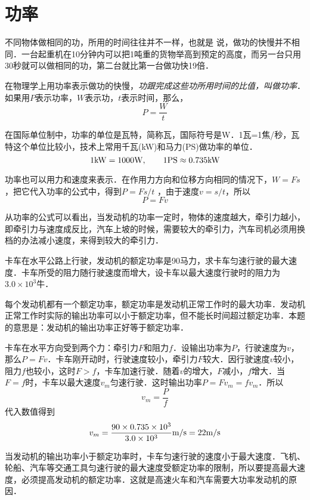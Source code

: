 \section{功率}

不同物体做相同的功，所用的时间往往并不一样，也就是
说，做功的快慢并不相同．一台起重机在10分钟内可以把1吨重的货物举高到预定的高度，而另一台只用30秒就可以做相同的功，第二台就比第一台做功快19倍．

在物理学上用功率表示做功的快慢，\textit{功跟完成这些功所用时间的比值，叫做功率}．如果用$P$表示功率，$W$表示功，$t$表示时间，那么，
\[P=\frac{W}{t}\]

在国际单位制中，功率的单位是瓦特，简称瓦，国际符号是W．1瓦=1焦/秒，瓦特这个单位比较小，技术上常用千瓦(kW)和马力(PS)做功率的单位．
\[1{\rm kW}=1000{\rm W},\qquad 1{\rm PS}\approx 0.735{\rm kW}\]

功率也可以用力和速度来表示．在作用力方向和位移方向相同的情况下，$W=Fs$，把它代入功率的公式中，得到$P=Fs/t$
，由于速度$v=s/t$，所以
\[P=Fv \]

从功率的公式可以看出，当发动机的功率一定时，物体的速度越大，牵引力越小，即牵引力与速度成反比，汽车上坡的时候，需要较大的牵引力，汽车司机必须用换档的办法减小速度，来得到较大的牵引力．


	
\begin{example}
卡车在水平公路上行驶，发动机的额定功率是90马力，求卡车匀速行驶的最大速度．卡车所受的阻力随行驶速度而增大，设卡车以最大速度行驶时的阻力为$3.0\times 10^3$牛．
\end{example}

\begin{solution}
    每个发动机都有一个额定功率，额定功率是发动机正常工作时的最大功率．发动机正常工作时实际的输出功率可以小于额定功率，但不能长时间超过额定功率．本题的意思是：发动机的输出功率正好等于额定功率．

卡车在水平方向受到两个力：牵引力$F$和阻力$f$．设输出功率为$P$，行驶速度为$v$，那么$P=Fv$．卡车刚开动时，行驶速度较小，牵引力$F$较大．因行驶速度$v$较小，阻力$f$也较小，这时$F>f$，卡车加速行驶．随着$v$的增大，$F$减小，$f$增大．当$F=f$时，卡车以最大速度$v_m$匀速行驶．这时输出功率$P=Fv_m=fv_m$．所以
\[v_m=\frac{P}{f}\]
代入数值得到
\[v_m=\frac{90\times 0.735\times 10^3}{3.0\times 10^3}{\text{m}/\text{s}}=22\text{m}/\text{s} \]

当发动机的输出功率小于额定功率时，卡车匀速行驶的速度小于最大速度．飞机、轮船、汽车等交通工具匀速行驶的最大速度受额定功率的限制，所以要提高最大速度，必须提高发动机的额定功率．这就是高速火车和汽车需要大功率发动机的原因．
\end{solution}
	
